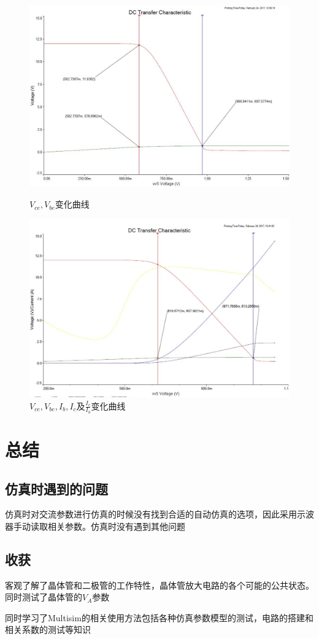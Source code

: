 \documentclass[UTF8,a4paper]{ctexart}
\begin{document}
\begin{figure}
\includegraphics[width=\textwidth]{cap/20.JPG}
\caption{$V_{ce},V_{be}$变化曲线}
\label{simple}
\includegraphics[width=\textwidth]{cap/14.JPG}
\caption{$V_{ce},V_{be},I_b,I_c$及$\frac{I_c}{I_b}$变化曲线}
\label{complex}
\end{figure}
\section{总结}
\subsection{仿真时遇到的问题}
仿真时对交流参数进行仿真的时候没有找到合适的自动仿真的选项，因此采用示波器手动读取相关参数。仿真时没有遇到其他问题
\subsection{收获}
客观了解了晶体管和二极管的工作特性，晶体管放大电路的各个可能的公共状态。同时测试了晶体管的$V_A$参数  

同时学习了Multisim的相关使用方法包括各种仿真参数模型的测试，电路的搭建和相关系数的测试等知识
\end{document}
